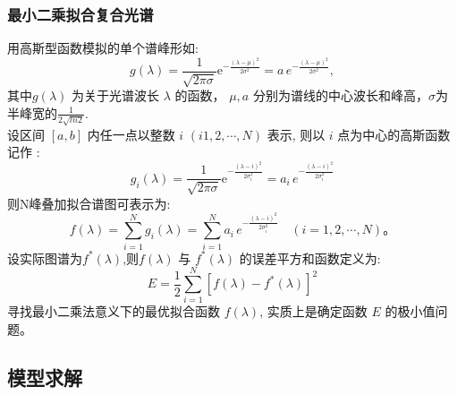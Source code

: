 \documentclass{article}
\numberwithin{equation}{subsection}
\begin{document}
\subsubsection{最小二乘拟合复合光谱}
用高斯型函数模拟的单个谱峰形如:
$$
g(\lambda)=\frac{1}{\sqrt{2 \pi \sigma}} \mathrm{e}^{-\frac{(\lambda-\mu)^{2}}{2 \sigma^{2}}}=a\,e^{-\frac{(\lambda-\mu)^{2}}{2 \sigma^{2}}},
$$
其中$g(\lambda)$ 为关于光谱波长 $\lambda$ 的函数， $\mu, a$ 分别为谱线的中心波长和峰高，$\sigma$为半峰宽的$\frac{1}{2\sqrt{ln2} }$.\\
设区间 $[a, b]$ 内任一点以整数 $i$ $(i1,2, \cdots, N)$ 表示, 则以 $i$ 点为中心的高斯函数记作 :
$$
g_{i}(\lambda)=\frac{1}{\sqrt{2 \pi \sigma}} \mathrm{e}^{-\frac{(\lambda-i)^{2}}{2 \sigma_i^{2}}}=a_i\,e^{-\frac{(\lambda-i)^{2}}{2 \sigma_i^{2}}}
$$
则N峰叠加拟合谱图可表示为:
$$
f(\lambda) = \sum_{i=1}^{N} g_{i}(\lambda)=\sum_{i=1}^{N} a_i\,e^{-\frac{(\lambda-i)^{2}}{2 \sigma_i^{2}}}\quad (i=1,2, \cdots, N) 。
$$
设实际图谱为$f^{*}(\lambda)$,则$f(\lambda)$ 与 $f^{*}(\lambda)$ 的误差平方和函数定义为:
$$
E=\frac{1}{2} \sum\limits_{i=1}^{N}\left[f(\lambda)-f^{*}(\lambda)\right]^{2}
$$
寻找最小二乘法意义下的最优拟合函数 $f(\lambda)$, 实质上是确定函数 $E$ 的极小值问题。 

\subsection{模型求解}
\end{document}
